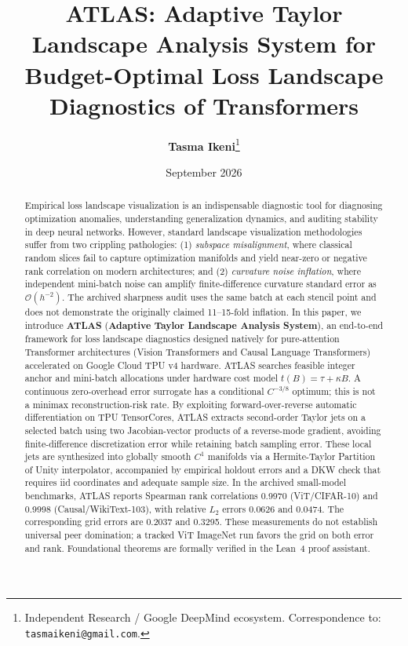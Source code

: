 \documentclass[11pt,a4paper]{article}
\title{\textbf{ATLAS: Adaptive Taylor Landscape Analysis System for\\Budget-Optimal Loss Landscape Diagnostics of Transformers}}
\author{
  \textbf{Tasma Ikeni}\thanks{Independent Research / Google DeepMind ecosystem. Correspondence to: \texttt{tasmaikeni@gmail.com}.}
}
\date{September 2026}
\theoremstyle{definition}
\theoremstyle{remark}
\begin{document}
\maketitle

\begin{abstract}
Empirical loss landscape visualization is an indispensable diagnostic tool for diagnosing optimization anomalies, understanding generalization dynamics, and auditing stability in deep neural networks. However, standard landscape visualization methodologies suffer from two crippling pathologies: (1) \emph{subspace misalignment}, where classical random slices fail to capture optimization manifolds and yield near-zero or negative rank correlation on modern architectures; and (2) \emph{curvature noise inflation}, where independent mini-batch noise can amplify finite-difference curvature standard error as $\mathcal{O}(h^{-2})$. The archived sharpness audit uses the same batch at each stencil point and does not demonstrate the originally claimed 11--15-fold inflation. In this paper, we introduce \textbf{ATLAS} (\textbf{Adaptive Taylor Landscape Analysis System}), an end-to-end framework for loss landscape diagnostics designed natively for pure-attention Transformer architectures (Vision Transformers and Causal Language Transformers) accelerated on Google Cloud TPU v4 hardware. ATLAS searches feasible integer anchor and mini-batch allocations under hardware cost model $t(B) = \tau + \kappa B$. A continuous zero-overhead error surrogate has a conditional $C^{-3/8}$ optimum; this is not a minimax reconstruction-risk rate. By exploiting forward-over-reverse automatic differentiation on TPU TensorCores, ATLAS extracts second-order Taylor jets on a selected batch using two Jacobian-vector products of a reverse-mode gradient, avoiding finite-difference discretization error while retaining batch sampling error. These local jets are synthesized into globally smooth $C^1$ manifolds via a Hermite-Taylor Partition of Unity interpolator, accompanied by empirical holdout errors and a DKW check that requires iid coordinates and adequate sample size. In the archived small-model benchmarks, ATLAS reports Spearman rank correlations 0.9970 (ViT/CIFAR-10) and 0.9998 (Causal/WikiText-103), with relative $L_2$ errors 0.0626 and 0.0474. The corresponding grid errors are 0.2037 and 0.3295. These measurements do not establish universal peer domination; a tracked ViT ImageNet run favors the grid on both error and rank. Foundational theorems are formally verified in the Lean~4 proof assistant.
\end{abstract}
\end{document}
